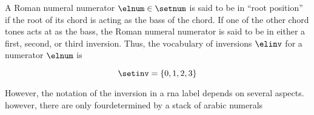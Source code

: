 
A Roman numeral numerator $\elnum \in \setnum$ is said to be
in ``root position'' if the root of its chord is acting as
the bass of the chord. If one of the other chord tones acts
at as the bass, the Roman numeral numerator is said to be in
either a first, second, or third inversion. Thus, the
vocabulary of inversions $\elinv$ for a numerator $\elnum$ is 

\begin{equation}
    \label{eq:inversion_vocabulary}
    \setinv = \{ 0, 1, 2, 3 \}
\end{equation}


However, the notation of the inversion in a \gls{rna} label
depends on several aspects. however, there are only
fourdetermined by a stack of arabic numerals


        
